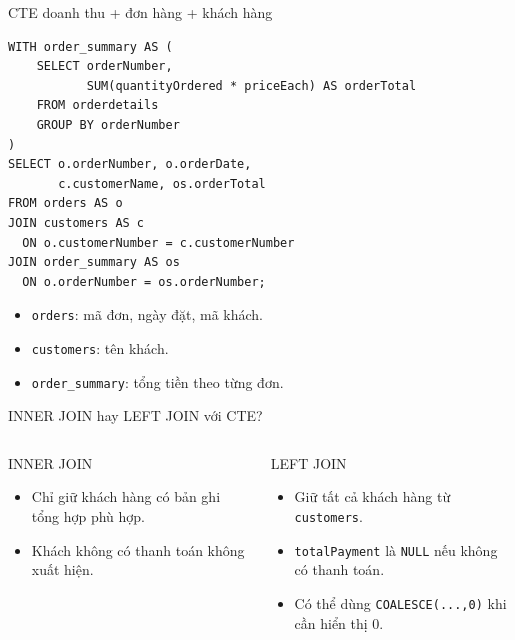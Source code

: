 \documentclass[aspectratio=169,10pt]{beamer}
\newcommand{\code}[1]{\texttt{#1}}
\begin{document}
\begin{frame}[fragile]{CTE doanh thu + đơn hàng + khách hàng}
\small
\begin{lstlisting}[basicstyle=\ttfamily\scriptsize]
WITH order_summary AS (
    SELECT orderNumber,
           SUM(quantityOrdered * priceEach) AS orderTotal
    FROM orderdetails
    GROUP BY orderNumber
)
SELECT o.orderNumber, o.orderDate,
       c.customerName, os.orderTotal
FROM orders AS o
JOIN customers AS c
  ON o.customerNumber = c.customerNumber
JOIN order_summary AS os
  ON o.orderNumber = os.orderNumber;
\end{lstlisting}
\vspace{.1em}
\begin{itemize}
\item \code{orders}: mã đơn, ngày đặt, mã khách.
\item \code{customers}: tên khách.
\item \code{order\_summary}: tổng tiền theo từng đơn.
\end{itemize}
\end{frame}

\begin{frame}[fragile]{INNER JOIN hay LEFT JOIN với CTE?}
\begin{columns}[T,onlytextwidth]
\begin{block}{INNER JOIN}
\small
\begin{itemize}
\item Chỉ giữ khách hàng có bản ghi tổng hợp phù hợp.
\item Khách không có thanh toán không xuất hiện.
\end{itemize}
\end{block}
\begin{block}{LEFT JOIN}
\small
\begin{itemize}
\item Giữ tất cả khách hàng từ \texttt{customers}.
\item \texttt{totalPayment} là \texttt{NULL} nếu không có thanh toán.
\item Có thể dùng \texttt{COALESCE(...,0)} khi cần hiển thị 0.
\end{itemize}
\end{block}
\end{columns}
\end{frame}
\end{document}
